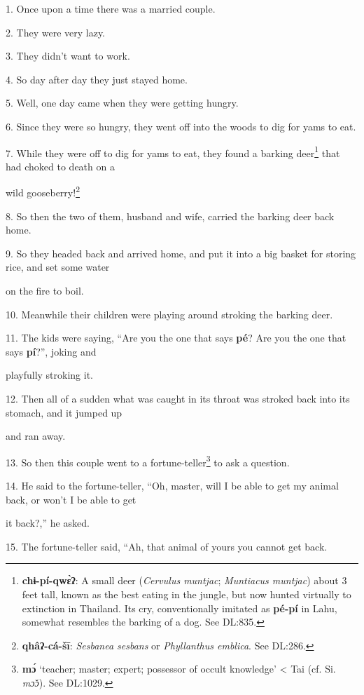 \setcounter{footnote}{0}

1. Once upon a time there was a married couple.

2. They were very lazy.

3. They didn't want to work.

4. So day after day they just stayed home.

5. Well, one day came when they were getting hungry.

6. Since they were so hungry, they went off into the woods to dig for yams to eat.

7. While they were off to dig for yams to eat, they found a barking deer\footnote{\textbf{chɨ-pí-qwɛ̀ʔ}: A small deer (\textit{Cervulus muntjac}; \textit{Muntiacus muntjac}) about 3 feet tall, known as the best eating in the jungle, but now hunted virtually to extinction in Thailand. Its cry, conventionally imitated as \textbf{pé-pí} in Lahu, somewhat resembles the barking of a dog. See DL:835.} that
had choked to death on a

wild gooseberry!\footnote{\textbf{qhâʔ-cá-šī}: \textit{Sesbanea sesbans }or \textit{Phyllanthus emblica}. See DL:286.}

8. So then the two of them, husband and wife, carried the barking deer back home.

9. So they headed back and arrived home, and put it into a big basket for storing
rice, and set some water

on the fire to boil.

10. Meanwhile their children were playing around stroking the barking deer.

11. The kids were saying, ``Are you the one that says \textbf{pé}? Are you the
one that says \textbf{pí}?'', joking and

playfully stroking it.

12. Then all of a sudden what was caught in its throat was stroked back into its
stomach, and it jumped up

and ran away.

13. So then this couple went to a fortune-teller\footnote{\textbf{mɔ́} `teacher; master; expert; possessor of occult knowledge' < Tai (cf. Si. \textit{mɔ̌ɔ}). See DL:1029.} to ask a question.

14. He said to the fortune-teller, ``Oh, master, will I be able to get my animal
back, or won't I be able to get

it back?,'' he asked.

15. The fortune-teller said, ``Ah, that animal of yours you cannot get back.

